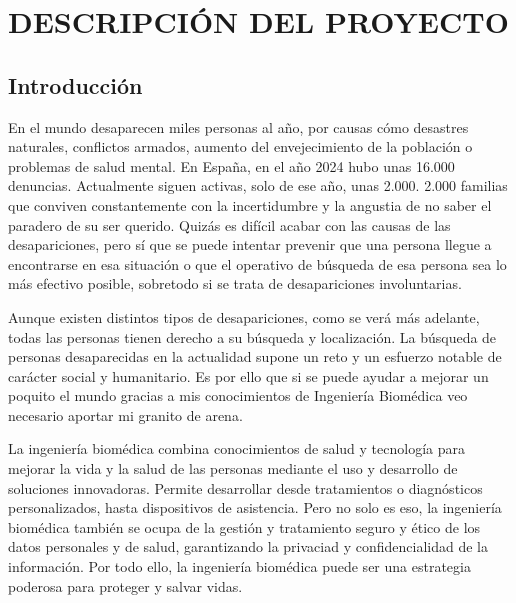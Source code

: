 \chapter{DESCRIPCIÓN DEL PROYECTO}

    \section{Introducción}\label{intro}
    
    En el mundo desaparecen miles personas al año, por causas cómo desastres naturales, conflictos armados, aumento del envejecimiento de la población o problemas de salud mental. En España, en el año 2024 hubo unas 16.000 denuncias. Actualmente siguen activas, solo de ese año, unas 2.000. 2.000 familias que conviven constantemente con la incertidumbre y la angustia de no saber el paradero de su ser querido. \cite{DatosDesaparecidos2024, InformeCNDES2025} Quizás es difícil acabar con las causas de las desapariciones, pero sí que se puede intentar prevenir que una persona llegue a encontrarse en esa situación o que el operativo de búsqueda de esa persona sea lo más efectivo posible, sobretodo si se trata de desapariciones involuntarias. 
    
    Aunque existen distintos tipos de desapariciones, como se verá más adelante, todas las personas tienen derecho a su búsqueda y localización. La búsqueda de personas desaparecidas en la actualidad supone un reto y un esfuerzo notable de carácter social y humanitario\cite{garcia2019personas}. Es por ello que si se puede ayudar a mejorar un poquito el mundo gracias a mis conocimientos de Ingeniería Biomédica veo necesario aportar mi granito de arena.
    

    
    La ingeniería biomédica combina conocimientos de salud y tecnología para mejorar la vida y la salud de las personas mediante el uso y desarrollo de soluciones innovadoras. Permite desarrollar desde tratamientos o diagnósticos personalizados, hasta dispositivos de asistencia. Pero no solo es eso, la ingeniería biomédica también se ocupa de la gestión y tratamiento seguro y ético de los datos personales y de salud, garantizando la privaciad y confidencialidad de la información. Por todo ello, la ingeniería biomédica puede ser una estrategia poderosa para proteger y salvar vidas.

